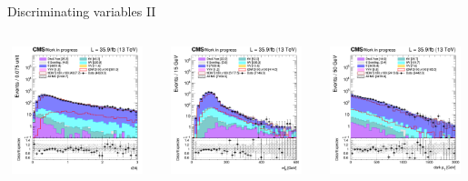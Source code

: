 \documentclass[8pt]{beamer}
\begin{document}
\begin{frame}{Discriminating variables II}
\begin{columns}
\begin{column}{0.33\textwidth}
\begin{center}
    		\end{center}		
		\end{column}
\end{columns}
\vspace{-5pt}
\begin{columns}
		\begin{column}{0.33\textwidth}
			\begin{center}
     			\includegraphics[width=1.0\textwidth, height=105pt]{figs/2016/SmearSR-ttDM-scalar100/log_cratio_topCR_ll_r2l4j.png}
    		\end{center}		
		\end{column}
		\begin{column}{0.33\textwidth}
			\begin{center}
     			\includegraphics[width=1.0\textwidth, height=105pt]{figs/2016/SmearSR-ttDM-scalar100/log_cratio_topCR_ll_mblt.png}
    		\end{center}		
		\end{column}
		\begin{column}{0.33\textwidth}
			\begin{center}
     			\includegraphics[width=1.0\textwidth, height=105pt]{figs/2016/SmearSR-ttDM-scalar100/log_cratio_topCR_ll_dark_pt.png}
    		\end{center}		
		\end{column}
\end{columns} \vfill
\end{frame}
\end{document}
